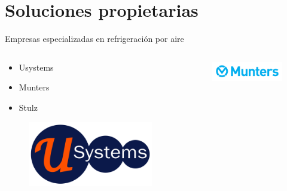 \documentclass[aspectratio=169, compress]{beamer}
\begin{document}
\section{Soluciones propietarias}

\begin{frame}{Empresas especializadas en refrigeración por aire}
    \begin{columns}
        \begin{column}{0.5\textwidth}
           
            \begin{itemize}
                \item Usystems
                \item Munters
                \item Stulz
            \end{itemize}
        
            \begin{figure}
                \begin{center}
                    \includegraphics[scale=0.25]{./figures/usystems}
                \end{center}
            \end{figure}
            
        \end{column}
        \begin{column}{0.5\textwidth}  
            
            \begin{figure}
                \begin{center}
                    \includegraphics[scale=0.5]{./figures/munters}
                \end{center}
            \end{figure}
        

\end{column}
\end{columns}
\end{frame}
\end{document}
